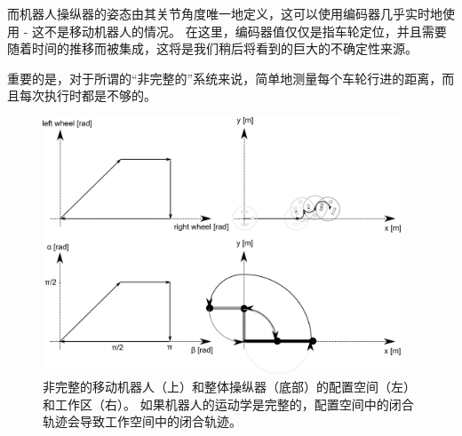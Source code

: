 而机器人操纵器的姿态由其关节角度唯一地定义，这可以使用编码器几乎实时地使用 - 这不是移动机器人的情况。 在这里，编码器值仅仅是指车轮定位，并且需要随着时间的推移而被集成，这将是我们稍后将看到的巨大的不确定性来源。


重要的是，对于所谓的“非完整的”系统来说，简单地测量每个车轮行进的距离，而且每次执行时都是不够的。

\begin{figure}[htb!]
	\centering
		\includegraphics[width=0.95\textwidth]{figs/holonomy.png}
	\caption{非完整的移动机器人（上）和整体操纵器（底部）的配置空间（左）和工作区（右）。 如果机器人的运动学是完整的，配置空间中的闭合轨迹会导致工作空间中的闭合轨迹。}
	\label{fig:holonomy}
\end{figure}

